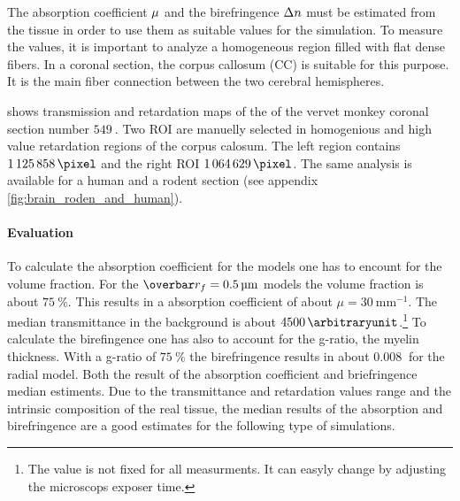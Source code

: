 %
The absorption coefficient $\textnormal{$\mu$}{}$ and the birefringence $\textnormal{$\Delta n$}{}$ must be estimated from the tissue in order to use them as suitable values for the simulation.
To measure the values, it is important to analyze a homogeneous region filled with flat dense fibers.
In a coronal section, the corpus callosum (CC) is suitable for this purpose. 
It is the main fiber connection between the two cerebral hemispheres.
\par
% 
 shows transmission and retardation maps of the of the vervet monkey coronal section number $\SI{549}{}$.
Two \ac{ROI} are manuelly selected in homogenious and high value retardation regions of the corpus calosum.
The left region contains $\SI{1125858}{\pixel}$ and the right \ac{ROI} $\SI{1064629}{\pixel}$.
The same analysis is available for a human and a rodent section (see appendix \cref{fig:brain_roden_and_human}).
% 
\paragraph{Evaluation}
To calculate the absorption coefficient for the models one has to encount for the volume fraction.
For the $\fiberRadiusMean = \SI{0.5}{\micro\meter}$ models the volume fraction is about $\SI{75}{\percent}$.
This results in a absorption coefficient of about $\mu = \SI{30}{\milli\meter\tothe{-1}}$.
The median transmittance in the background is about $\SI{4500}{\arbitraryunit}$.\footnote{The value is not fixed for all measurments. It can easyly change by adjusting \eg{} the microscops exposer time.}
To calculate the birefingence one has also to account for the g-ratio, \ie{} the myelin thickness.
With a g-ratio of $\SI{75}{\percent}$ the birefringence results in about $\SI{0.008}{}$ for the radial model.
Both the result of the absorption coefficient and briefringence median estiments.
Due to the transmittance and retardation values range and the intrinsic composition of the real tissue, the median results of the absorption and birefringence are a good estimates for the following type of simulations.
%
% 
% 
